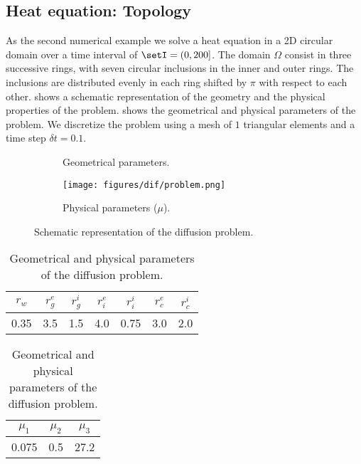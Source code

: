 \subsection{Heat equation: Topology} \label{ssec:Heat}

As the second numerical example we solve a heat equation in a 2D circular domain over a time interval of $\setI=(0,200]$. The domain $\Omega$ consist in three successive rings, with seven circular inclusions in the inner and outer rings. The inclusions are distributed evenly in each ring shifted by $\pi$ with respect to each other.  shows a schematic representation of the geometry and the physical properties of the problem.  shows the geometrical and physical parameters of the problem. We discretize the problem using a mesh of $1$ triangular elements and a time step $\delta t = 0.1$.

\begin{figure}[H]
    \centering
	\begin{subfigure}[htb!]{0.49\textwidth}
	    \centering
	    
	    \caption{Geometrical parameters.}
        \label{fig:dif-problem-1}
    \end{subfigure}
    \begin{subfigure}[htb!]{0.49\textwidth}
	    \centering
	    \texttt{[image: figures/dif/problem.png]}
	    \caption{Physical parameters ($\mu$).}
        \label{fig:dif-problem-2}
    \end{subfigure}
    \caption{Schematic representation of the diffusion problem.}
    \label{fig:dif-problem}
\end{figure}

\begin{table}[!htb]
\centering
\caption{Geometrical and physical parameters of the diffusion problem.}
\begin{subtable}[h]{0.4\textwidth}
    \centering
    {\small
    \begin{tabular}{ccccccc}
        \toprule
        $r_w$ & $r_g^e$ & $r_g^i$ & $r_i^e$ & $r_i^i$ & $r_c^e$ & $r_c^i$  \\ \midrule  
        0.35 & 3.5 & 1.5 & 4.0 & 0.75 & 3.0 & 2.0 \\ \bottomrule
    \end{tabular}}
    \label{tab:dif-geometry}
\end{subtable}
\begin{subtable}[h]{0.3\textwidth}
    \centering
    {\small
    \begin{tabular}{ccc}
        \toprule
        $\mu_1$ & $\mu_2$ & $\mu_3$  \\ \midrule  
        0.075 & 0.5 & 27.2 \\ \bottomrule
    \end{tabular}}
    \label{tab:dif-material}
\end{subtable}
\label{tab:dif-data}
\end{table}


